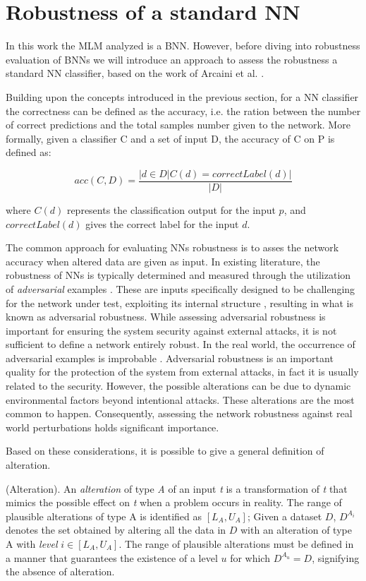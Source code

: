 \section{Robustness of a standard NN}
In this work the MLM analyzed is a BNN. However, before diving into robustness evaluation of BNNs we will introduce an approach to assess the robustness a standard NN classifier, based on the work of Arcaini et al. \cite{9176802}.

Building upon the concepts introduced in the previous section, for a NN classifier the correctness can be defined as the accuracy, i.e. the ration between the number of correct predictions and the total samples number given to the network. More formally, given a classifier C and a set of input D, the accuracy of C on P is defined as:

\[
	acc(C,D) = \frac{|{d \in D | C(d) = correctLabel(d)}|}{|D|}
\] 

where $C(d)$ represents the classification output for the input $p$, and $correctLabel(d)$ gives the correct label for the input $d$.

The common approach for evaluating NNs robustness is to asses the network accuracy when altered data are given as input.
In existing literature, the robustness of NNs is typically determined and measured through the utilization of \textit{adversarial} examples \cite{rnnvta2018} \cite{9785704}. These are inputs specifically designed to be challenging for the network under test, exploiting its internal structure \cite{759851e20d2e47aaad2a560211f6a126}, resulting in what is known as adversarial robustness.
While assessing adversarial robustness is important for ensuring the system security against external attacks, it is not sufficient to define a network entirely robust.
In the real world, the occurrence of adversarial examples is improbable \cite{8805674}.
Adversarial robustness is an important quality for the protection of the system from external attacks, in fact it is usually related to the security. However, the possible alterations can be due to dynamic environmental factors beyond intentional attacks. These alterations are the most common to happen. Consequently, assessing the network robustness against real world perturbations holds significant importance.

Based on these considerations, it is possible to give a general definition of alteration.

\begin{definition} (Alteration).
	An \textit{alteration} of type \textit{A} of an input \textit{t} is a transformation of \textit{t} that mimics the possible effect on \textit{t} when a problem occurs in reality. The range of plausible alterations of type A is identified as $[L_A, U_A]$; Given a dataset $D$, $D^{A_i}$ denotes the set obtained by altering all the data in $D$ with an alteration of type A with \textit{level} $i \in [L_A, U_A]$.
	The range of plausible alterations must be defined in a manner that guarantees the existence of a level $u$ for which $D^{A_u} = D$, signifying the absence of alteration. 
\end{definition}
 
